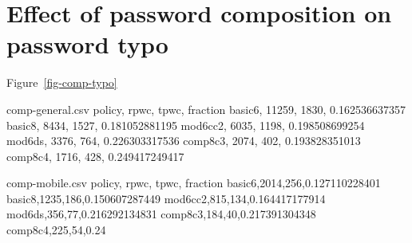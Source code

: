 \documentclass{article}
\begin{document}
\section{Effect of password composition on password typo}
Figure~\ref{fig-comp-typo}
\begin{filecontents*}{comp-general.csv}
policy, rpwc, tpwc, fraction
basic6, 11259, 1830, 0.162536637357
basic8, 8434, 1527, 0.181052881195
mod6cc2, 6035, 1198, 0.198508699254
mod6ds, 3376, 764, 0.226303317536
comp8c3, 2074, 402, 0.193828351013
comp8c4, 1716, 428, 0.249417249417
\end{filecontents*}
\begin{filecontents*}{comp-mobile.csv}
policy, rpwc, tpwc, fraction
basic6,2014,256,0.127110228401
basic8,1235,186,0.150607287449
mod6cc2,815,134,0.164417177914
mod6ds,356,77,0.216292134831
comp8c3,184,40,0.217391304348
comp8c4,225,54,0.24
\end{filecontents*}
\end{document}

